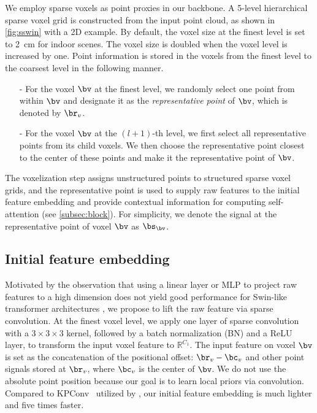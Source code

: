 \documentclass[10pt,twocolumn,letterpaper]{article}
\begin{document}
 We employ sparse voxels as point proxies in our backbone. A 5-level hierarchical sparse voxel grid is constructed from the input point cloud, as shown in \cref{fig:sswin} with a 2D example. By default, the voxel size at the finest level is set to \SI{2}{\centi\meter} for indoor scenes. The voxel size is doubled when the voxel level is increased by one. Point information is stored in the voxels from the finest level to the coarsest level in the following manner.
\begin{enumerate}[leftmargin=*]\item[-] For the voxel $\bv$ at the finest level, we randomly select one point from within $\bv$ and designate it as the \emph{representative point} of $\bv$, which is denoted by $\br_v$.
    \item[-] For the voxel $\bv$ at the $(l+1)$-th level, we first select all representative points from its child voxels. We then choose the representative point closest to the center of these points and make it the representative point of $\bv$.
\end{enumerate}
The voxelization step assigns unstructured points to structured sparse voxel grids, and the representative point is used to supply raw features to the initial feature embedding and provide contextual information for computing {\SST} self-attention (see \cref{subsec:block}). For simplicity, we denote the signal at the representative point of voxel $\bv$ as $\bs_{\bv}$.

\subsection{Initial feature embedding} \label{subsec:initembedding}
Motivated by the observation that using a linear layer or MLP to project raw features to a high dimension does not yield good performance for Swin-like transformer architectures \cite{lai2022stratified}, we propose to lift the raw feature via sparse convolution. At the finest voxel level, we apply one layer of sparse convolution with a $3\times3\times 3$ kernel, followed by a batch normalization (BN) and a ReLU layer, to transform the input voxel feature to $\mathbb{R}^{C_1}$. The input feature on voxel $\bv$ is set as the concatenation of the positional offset: $\br_v - \bc_v$ and other point signals stored at $\br_v$, where $\bc_v$ is the center of $\bv$. We do not use the absolute point position because our goal is to learn local priors via convolution. Compared to KPConv~\cite{Thomas2019} utilized by \cite{lai2022stratified}, our initial feature embedding is much lighter and five times faster.
\end{document}
